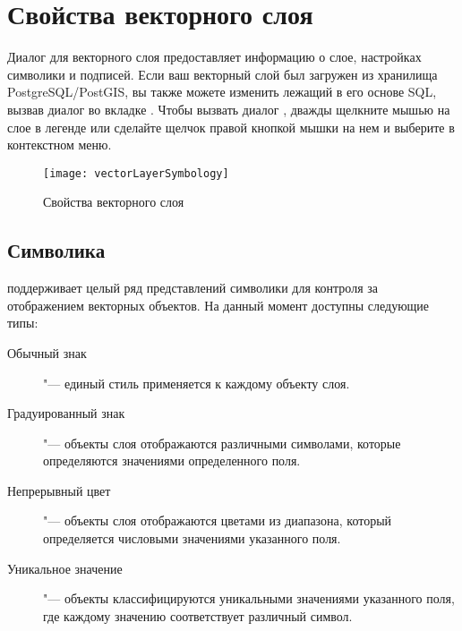 \section{Свойства векторного слоя}\label{sec:vectorprops}

Диалог  для векторного слоя предоставляет информацию
о слое, настройках символики и подписей. Если ваш векторный слой был загружен
из хранилища PostgreSQL/PostGIS, вы также можете изменить лежащий в его
основе SQL, вызвав диалог  во вкладке .
Чтобы вызвать диалог , дважды щелкните мышью на слое в
легенде или сделайте щелчок правой кнопкой мышки на нем и выберите
 в контекстном меню.

\begin{figure}[ht]
   \centering
   \texttt{[image: vectorLayerSymbology]}
   \caption{Свойства векторного слоя \wincaption}\label{fig:vector_symbology}
 \end{figure}

\subsection{Символика}\label{sec:symbology}

\qg поддерживает целый ряд представлений символики для контроля за
 отображением векторных объектов. На данный момент доступны следующие
типы:

\begin{description}
    \item[Обычный знак] "--- единый стиль применяется к каждому
    объекту слоя.
    \item[Градуированный знак] "--- объекты слоя
    отображаются различными символами, которые определяются значениями
    определенного поля.
    \item[Непрерывный цвет] "--- объекты слоя отображаются цветами из
    диапазона, который определяется числовыми значениями указанного поля.
    \item[Уникальное значение] "--- объекты классифицируются уникальными
    значениями указанного поля, где каждому значению соответствует
    различный символ.
\end{description}


